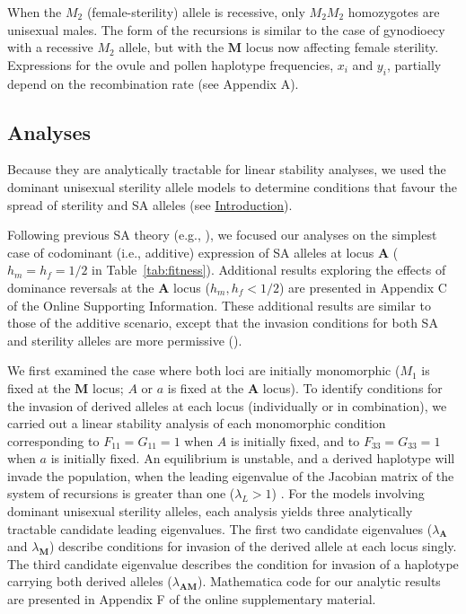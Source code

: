 \documentclass{article}
\begin{document}
When the $M_2$ (female-sterility) allele is recessive, only $M_2 M_2$ homozygotes are unisexual males. The form of the recursions is similar to the case of gynodioecy with a recessive $M_2$ allele, but with the $\mathbf{M}$ locus now affecting female sterility. Expressions for the ovule and pollen haplotype frequencies, $x_i$ and $y_i$, partially depend on the recombination rate (see Appendix A).


\subsection*{Analyses} \label{subsec:analyses}

Because they are analytically tractable for linear stability analyses, we used the dominant unisexual sterility allele models to determine conditions that favour the spread of sterility and SA alleles (see \hyperref[sec:Introduction]{Introduction}).  

Following previous SA theory (e.g., \citealp{Kidwell1977, Prout2000, JordanConnallon2014}), we focused our analyses on the simplest case of codominant (i.e., additive) expression of SA alleles at locus $\mathbf{A}$ ($h_m = h_f = 1/2$ in Table~\ref{tab:fitness}). Additional results exploring the effects of dominance reversals at the $\mathbf{A}$ locus ($h_m, h_f < 1/2$) are presented in Appendix C of the Online Supporting Information. These additional results are similar to those of the additive scenario, except that the invasion conditions for both SA and sterility alleles are more permissive (\citealt{Fry2010, JordanConnallon2014, Olito2017}).

We first examined the case where both loci are initially monomorphic ($M_1$ is fixed at the $\mathbf{M}$ locus; $A$ or $a$ is fixed at the $\mathbf{A}$ locus). To identify conditions for the invasion of derived alleles at each locus (individually or in combination), we carried out a linear stability analysis of each monomorphic condition corresponding to $F_{11} = G_{11} = 1$ when $A$ is initially fixed, and to $F_{33} = G_{33} = 1$ when $a$ is initially fixed. An equilibrium is unstable, and a derived haplotype will invade the population, when the leading eigenvalue of the Jacobian matrix of the system of recursions is greater than one ($\lambda_L > 1$) \citep{OttoDay2007}. For the models involving dominant unisexual sterility alleles, each analysis yields three analytically tractable candidate leading eigenvalues. The first two candidate eigenvalues ($\lambda_{\mathbf{A}}$ and $\lambda_{\mathbf{M}}$) describe conditions for invasion of the derived allele at each locus singly. The third candidate eigenvalue describes the condition for invasion of a haplotype carrying both derived alleles ($\lambda_{\mathbf{AM}}$). Mathematica code for our analytic results are presented in Appendix F of the online supplementary material.
\end{document}
